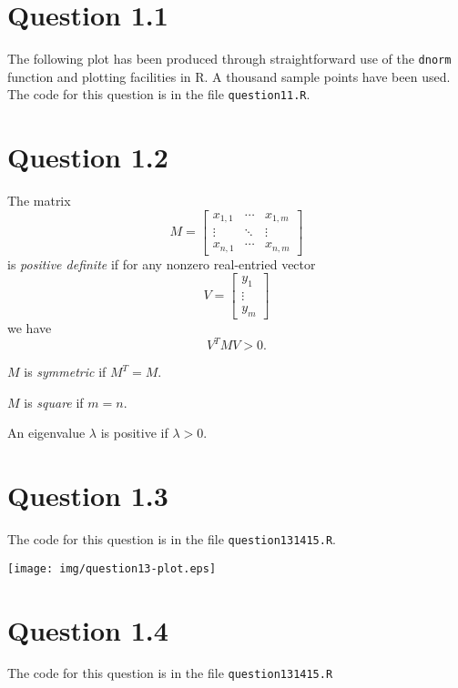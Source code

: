 \section*{Question 1.1}

The following plot has been produced through straightforward use of
the \texttt{dnorm} function and plotting facilities in R.  A thousand
sample points have been used.  The code for this question is in the
file \texttt{question11.R}.

\begin{figure}
 \begin{centering}
    
 \end{centering}
\end{figure}


\section*{Question 1.2}

The matrix
\[
M=\left[\begin{matrix}
  x_{1,1}&\cdots&x_{1,m}\\\vdots&\ddots&\vdots\\x_{n,1}&\cdots&x_{n,m} \end{matrix}\right]
\]
is \textit{positive definite} if for any nonzero real-entried vector
\[
V=\left[\begin{matrix} y_1 \\ \vdots \\ y_m \end{matrix}\right]
\]
we have
\[
V^TMV > 0.
\]

$M$ is \textit{symmetric} if $M^T=M$.

$M$ is \textit{square} if $m=n$.

An eigenvalue $\lambda$ is positive if $\lambda > 0$.

\section*{Question 1.3}

The code for this question is in the file \texttt{question131415.R}.

\texttt{[image: img/question13-plot.eps]}

\section*{Question 1.4}

The code for this question is in the file \texttt{question131415.R}

